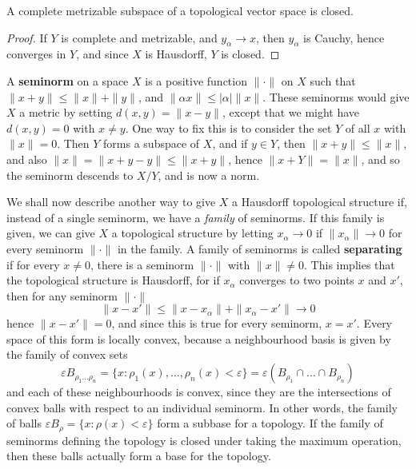 \begin{theorem}
    A complete metrizable subspace of a topological vector space is closed.
\end{theorem}
\begin{proof}
    If $Y$ is complete and metrizable, and $y_\alpha \to x$, then $y_\alpha$ is Cauchy, hence converges in $Y$, and since $X$ is Hausdorff, $Y$ is closed.
\end{proof}

A {\bf seminorm} on a space $X$ is a positive function $\| \cdot \|$ on $X$ such that $\| x + y \| \leq \| x \| + \| y \|$, and $\| \alpha x \| \leq |\alpha| \| x \|$. These seminorms would give $X$ a metric by setting $d(x,y) = \| x - y \|$, except that we might have $d(x,y) = 0$ with $x \neq y$. One way to fix this is to consider the set $Y$ of all $x$ with $\| x \| = 0$. Then $Y$ forms a subspace of $X$, and if $y \in Y$, then $\| x + y \| \leq \| x \|$, and also $\| x \| = \| x + y - y \| \leq \| x + y \|$, hence $\| x + Y \| = \| x \|$, and so the seminorm descends to $X/Y$, and is now a norm.

We shall now describe another way to give $X$ a Hausdorff topological structure if, instead of a single seminorm, we have a {\it family} of seminorms. If this family is given, we can give $X$ a topological structure by letting $x_\alpha \to 0$ if $\| x_\alpha \| \to 0$ for every seminorm $\| \cdot \|$ in the family. A family of seminorms is called {\bf separating} if for every $x \neq 0$, there is a seminorm $\| \cdot \|$ with $\| x \| \neq 0$. This implies that the topological structure is Hausdorff, for if $x_\alpha$ converges to two points $x$ and $x'$, then for any seminorm $\| \cdot \|$
%
\[ \| x - x' \| \leq \| x - x_\alpha \| + \| x_\alpha - x' \| \to 0 \]
%
hence $\| x - x' \| = 0$, and since this is true for every seminorm, $x = x'$. Every space of this form is locally convex, because a neighbourhood basis is given by the family of convex sets
%
\[ \varepsilon B_{\rho_1 \dots \rho_n} = \{ x: \rho_1(x), \dots, \rho_n(x) < \varepsilon \} = \varepsilon(B_{\rho_1} \cap \dots \cap B_{\rho_n}) \]
%
and each of these neighbourhoods is convex, since they are the intersections of convex balls with respect to an individual seminorm. In other words, the family of balls $\varepsilon B_\rho = \{ x : \rho(x) < \varepsilon \}$ form a subbase for a topology. If the family of seminorms defining the topology is closed under taking the maximum operation, then these balls actually form a base for the topology.

